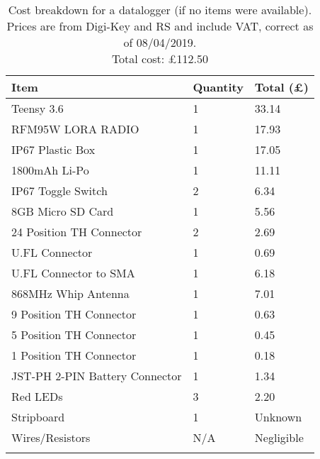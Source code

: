 \begin{table}[H]
\centering\small
\caption[Cost breakdown for a project datalogger]{Cost breakdown for a datalogger (if no items were available). Prices are from Digi-Key and RS and include VAT, correct as of 08/04/2019. \\ Total cost: \pounds112.50}
\label{fig:datalogger_cost}
\begin{tabular}{p{8cm}|p{2cm}|p{3cm}}
\toprule
\textbf{Item} & \textbf{Quantity} & \textbf{Total (\pounds)} \\
\midrule
Teensy 3.6 & 1 & 33.14 \\
RFM95W LORA RADIO & 1 & 17.93 \\
IP67 Plastic Box & 1 & 17.05 \\
1800mAh Li-Po & 1 & 11.11 \\
IP67 Toggle Switch & 2 & 6.34 \\
8GB Micro SD Card & 1 & 5.56 \\
24 Position TH Connector & 2 & 2.69 \\
U.FL Connector & 1 & 0.69 \\
U.FL Connector to SMA & 1 & 6.18 \\ 
868MHz Whip Antenna & 1 & 7.01 \\
9 Position TH Connector & 1 & 0.63 \\
5 Position TH Connector & 1 & 0.45 \\
1 Position TH Connector & 1 & 0.18 \\
JST-PH 2-PIN Battery Connector & 1 & 1.34 \\
Red LEDs & 3 & 2.20 \\
Stripboard & 1 & Unknown \\
Wires/Resistors & N/A & Negligible \\
\addlinespace\bottomrule
\end{tabular}
\end{table}